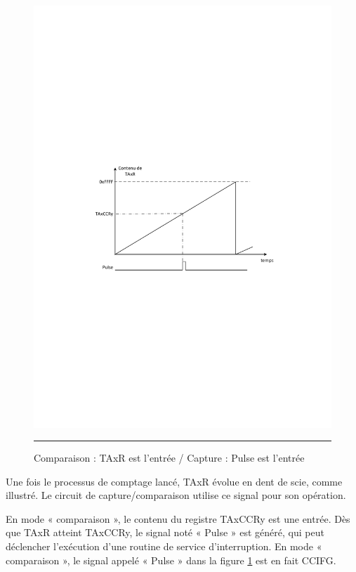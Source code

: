\begin{figure}[h]
  \centering
  \includegraphics[angle=0, width=14cm]{./Figures/Chap5_Timer/Timer_CC.pdf}
  \rule{35em}{0.5pt}
  \caption[CapvsComp]{Comparaison : TAxR est l'entrée / Capture : Pulse est l'entrée}
  \label{fig:CapvsComp}
\end{figure}

Une fois le processus de comptage lancé, TAxR évolue en dent de scie, comme illustré. Le circuit de capture/comparaison utilise ce signal pour son opération.

En mode « comparaison », le contenu du registre TAxCCRy est une entrée. Dès que TAxR atteint TAxCCRy, le signal noté « Pulse » est généré, qui peut déclencher l'exécution d'une routine de service d'interruption. En mode « comparaison », le signal appelé « Pulse » dans la figure \ref{fig:CapvsComp} est en fait CCIFG.

